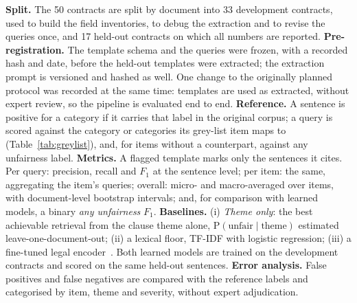 \textbf{Split.} The 50 contracts are split by document into 33 development contracts, used to build the field inventories, to debug the extraction and to revise the queries once, and 17 held-out contracts on which all numbers are reported. \textbf{Pre-registration.} The template schema and the queries were frozen, with a recorded hash and date, before the held-out templates were extracted; the extraction prompt is versioned and hashed as well. One change to the originally planned protocol was recorded at the same time: templates are used as extracted, without expert review, so the pipeline is evaluated end to end. \textbf{Reference.} A sentence is positive for a \corpus{} category if it carries that label in the original corpus; a query is scored against the category or categories its grey-list item maps to (Table~\ref{tab:greylist}), and, for items without a \corpus{} counterpart, against any unfairness label. \textbf{Metrics.} A flagged template marks only the sentences it cites. Per query: precision, recall and $F_1$ at the sentence level; per item: the same, aggregating the item's queries; overall: micro- and macro-averaged over items, with document-level bootstrap intervals; and, for comparison with learned models, a binary \emph{any unfairness} $F_1$. \textbf{Baselines.} (i) \emph{Theme only}: the best achievable retrieval from the clause theme alone, $\mathrm{P}(\text{unfair} \mid \text{theme})$ estimated leave-one-document-out; (ii) a lexical floor, TF-IDF with logistic regression; (iii) a fine-tuned legal encoder~\cite{chalkidis2020legalbert}. Both learned models are trained on the development contracts and scored on the same held-out sentences. \textbf{Error analysis.} False positives and false negatives are compared with the reference labels and categorised by item, theme and \corpus{} severity, without expert adjudication.
